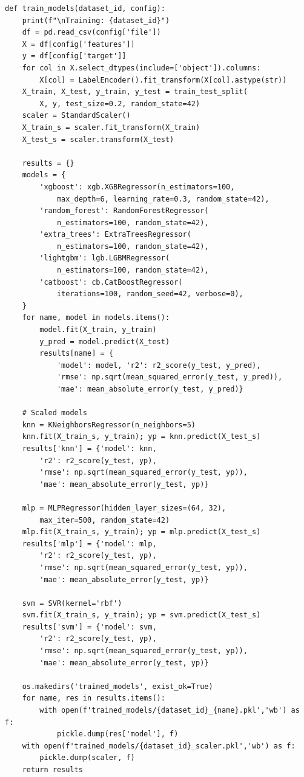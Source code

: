 \documentclass[12pt,a4paper,oneside]{report}
\begin{document}
\begin{lstlisting}[style=pythonstyle]
def train_models(dataset_id, config):
    print(f"\nTraining: {dataset_id}")
    df = pd.read_csv(config['file'])
    X = df[config['features']]
    y = df[config['target']]
    for col in X.select_dtypes(include=['object']).columns:
        X[col] = LabelEncoder().fit_transform(X[col].astype(str))
    X_train, X_test, y_train, y_test = train_test_split(
        X, y, test_size=0.2, random_state=42)
    scaler = StandardScaler()
    X_train_s = scaler.fit_transform(X_train)
    X_test_s = scaler.transform(X_test)

    results = {}
    models = {
        'xgboost': xgb.XGBRegressor(n_estimators=100,
            max_depth=6, learning_rate=0.3, random_state=42),
        'random_forest': RandomForestRegressor(
            n_estimators=100, random_state=42),
        'extra_trees': ExtraTreesRegressor(
            n_estimators=100, random_state=42),
        'lightgbm': lgb.LGBMRegressor(
            n_estimators=100, random_state=42),
        'catboost': cb.CatBoostRegressor(
            iterations=100, random_seed=42, verbose=0),
    }
    for name, model in models.items():
        model.fit(X_train, y_train)
        y_pred = model.predict(X_test)
        results[name] = {
            'model': model, 'r2': r2_score(y_test, y_pred),
            'rmse': np.sqrt(mean_squared_error(y_test, y_pred)),
            'mae': mean_absolute_error(y_test, y_pred)}

    # Scaled models
    knn = KNeighborsRegressor(n_neighbors=5)
    knn.fit(X_train_s, y_train); yp = knn.predict(X_test_s)
    results['knn'] = {'model': knn,
        'r2': r2_score(y_test, yp),
        'rmse': np.sqrt(mean_squared_error(y_test, yp)),
        'mae': mean_absolute_error(y_test, yp)}

    mlp = MLPRegressor(hidden_layer_sizes=(64, 32),
        max_iter=500, random_state=42)
    mlp.fit(X_train_s, y_train); yp = mlp.predict(X_test_s)
    results['mlp'] = {'model': mlp,
        'r2': r2_score(y_test, yp),
        'rmse': np.sqrt(mean_squared_error(y_test, yp)),
        'mae': mean_absolute_error(y_test, yp)}

    svm = SVR(kernel='rbf')
    svm.fit(X_train_s, y_train); yp = svm.predict(X_test_s)
    results['svm'] = {'model': svm,
        'r2': r2_score(y_test, yp),
        'rmse': np.sqrt(mean_squared_error(y_test, yp)),
        'mae': mean_absolute_error(y_test, yp)}

    os.makedirs('trained_models', exist_ok=True)
    for name, res in results.items():
        with open(f'trained_models/{dataset_id}_{name}.pkl','wb') as f:
            pickle.dump(res['model'], f)
    with open(f'trained_models/{dataset_id}_scaler.pkl','wb') as f:
        pickle.dump(scaler, f)
    return results


\end{lstlisting}
\end{document}
